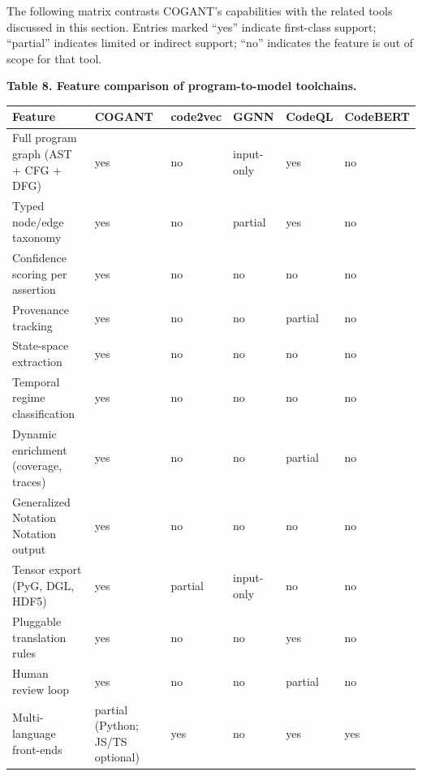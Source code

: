 \documentclass[
]{article}
\newcounter{none} %
\begin{document}
The following matrix contrasts COGANT's capabilities with the related
tools discussed in this section. Entries marked ``yes'' indicate
first-class support; ``partial'' indicates limited or indirect support;
``no'' indicates the feature is out of scope for that tool.

\textbf{Table 8. Feature comparison of program-to-model toolchains.}

{\def\LTcaptype{none} %
\begin{longtable}[]{@{}
  >{\raggedright\arraybackslash}p{}
  >{\centering\arraybackslash}p{}
  >{\centering\arraybackslash}p{}
  >{\centering\arraybackslash}p{}
  >{\centering\arraybackslash}p{}
  >{\centering\arraybackslash}p{}@{}}
\toprule\noalign{}
\begin{minipage}[b]{\linewidth}\raggedright
Feature
\end{minipage} & \begin{minipage}[b]{\linewidth}\centering
COGANT
\end{minipage} & \begin{minipage}[b]{\linewidth}\centering
code2vec
\end{minipage} & \begin{minipage}[b]{\linewidth}\centering
GGNN
\end{minipage} & \begin{minipage}[b]{\linewidth}\centering
CodeQL
\end{minipage} & \begin{minipage}[b]{\linewidth}\centering
CodeBERT
\end{minipage} \\
\midrule\noalign{}
\endhead
\bottomrule\noalign{}
\endlastfoot
Full program graph (AST + CFG + DFG) & yes & no & input-only & yes &
no \\
Typed node/edge taxonomy & yes & no & partial & yes & no \\
Confidence scoring per assertion & yes & no & no & no & no \\
Provenance tracking & yes & no & no & partial & no \\
State-space extraction & yes & no & no & no & no \\
Temporal regime classification & yes & no & no & no & no \\
Dynamic enrichment (coverage, traces) & yes & no & no & partial & no \\
Generalized Notation Notation output & yes & no & no & no & no \\
Tensor export (PyG, DGL, HDF5) & yes & partial & input-only & no & no \\
Pluggable translation rules & yes & no & no & yes & no \\
Human review loop & yes & no & no & partial & no \\
Multi-language front-ends & partial (Python; JS/TS optional) & yes & no
& yes & yes \\
\end{longtable}
}
\end{document}
